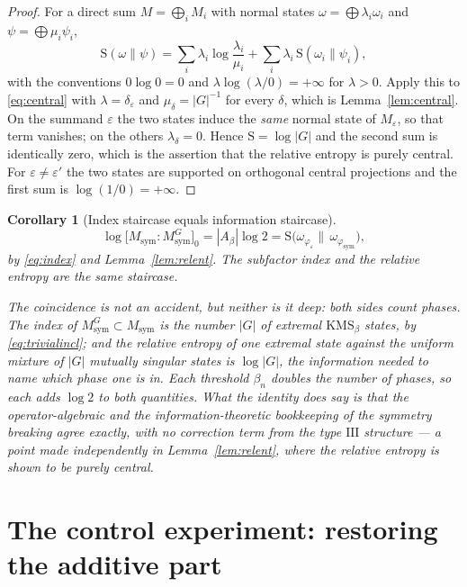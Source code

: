 \documentclass[11pt]{amsart}
\numberwithin{equation}{section}
\newtheorem{corollary}[theorem]{Corollary}
\theoremstyle{definition}
\theoremstyle{remark}
\newcommand{\Ent}{\mathrm{S}}
\newcommand{\Msym}{M_{\mathrm{sym}}}
\newcommand{\phisym}{\varphi_{\mathrm{sym}}}
\begin{document}
\begin{proof}
For a direct sum $M=\bigoplus_iM_i$ with normal states $\omega=\bigoplus\lambda_i\omega_i$
and $\psi=\bigoplus\mu_i\psi_i$,
\[
\Ent(\omega\|\psi)=\sum_i\lambda_i\log\frac{\lambda_i}{\mu_i}+\sum_i\lambda_i\,\Ent(\omega_i\|\psi_i),
\]
with the conventions $0\log0=0$ and $\lambda\log(\lambda/0)=+\infty$ for $\lambda>0$. Apply
this to \eqref{eq:central} with $\lambda=\delta_\varepsilon$ and $\mu_\delta=|G|^{-1}$ for
every $\delta$, which is Lemma~\ref{lem:central}. On the summand $\varepsilon$ the two
states induce the \emph{same} normal state of $M_\varepsilon$, so that term vanishes; on the
others $\lambda_\delta=0$. Hence $\Ent=\log|G|$ and the second sum is identically zero,
which is the assertion that the relative entropy is purely central. For
$\varepsilon\ne\varepsilon'$ the two states are supported on orthogonal central projections
and the first sum is $\log(1/0)=+\infty$.
\end{proof}

\begin{corollary}[Index staircase equals information staircase]\label{cor:staircase}
\[
\log\bigl[\Msym:\Msym^G\bigr]_0=|A_\beta|\log2=\Ent\bigl(\omega_{\varphi_\varepsilon}\big\|\,\omega_{\phisym}\bigr),
\]
by \eqref{eq:index} and Lemma~\ref{lem:relent}. The subfactor index and the relative
entropy are the same staircase.

The coincidence is not an accident, but neither is it deep: both sides count phases. The
index of $\Msym^G\subset\Msym$ is the number $|G|$ of extremal $\mathrm{KMS}_\beta$ states,
by \eqref{eq:trivialincl}; and the relative entropy of one extremal state against the
uniform mixture of $|G|$ mutually singular states is $\log|G|$, the information needed to
name which phase one is in. Each threshold $\beta_n$ doubles the number of phases, so each
adds $\log2$ to both quantities. What the identity does say is that the operator-algebraic
and the information-theoretic bookkeeping of the symmetry breaking agree exactly, with no
correction term from the type $\mathrm{III}$ structure --- a point made independently in
Lemma~\ref{lem:relent}, where the relative entropy is shown to be purely central.
\end{corollary}

\section{The control experiment: restoring the additive part}\label{sec:affine}
\end{document}
